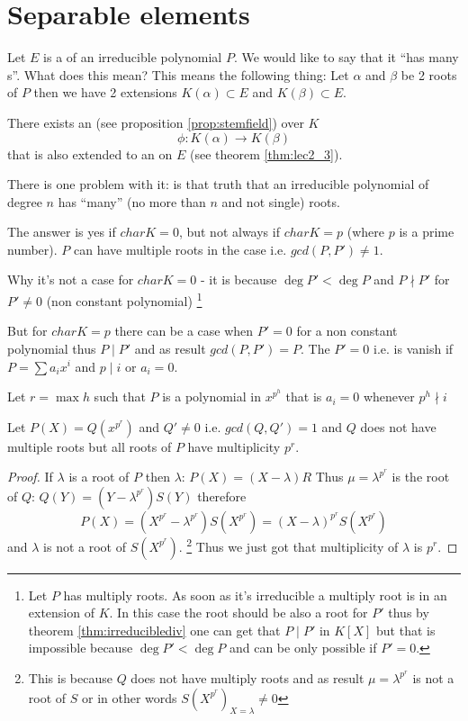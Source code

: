 \section{Separable elements}

Let $E$ is a  of an irreducible polynomial
$P$. We would like to say that it ``has many
s''. What does this mean? This means the
following thing:
Let $\alpha$ and $\beta$ be 2 roots of $P$ then we have 2 extensions
$K\left(\alpha\right) \subset E$ and 
$K\left(\beta\right) \subset E$.

There exists an  (see proposition
\ref{prop:stemfield}) over $K$
\[
\phi: K\left(\alpha\right) \to K\left(\beta\right)
\]
that is also extended to an  on $E$
(see theorem \ref{thm:lec2_3}).

There is one problem with it: is that truth that an irreducible
polynomial of degree $n$ has ``many'' (no more than $n$ and not
single) roots.

The answer is yes if $char K = 0$, but not always if $char K = p$
(where $p$ is a prime number). $P$ can have multiple roots in the case
i.e. $gcd(P, P') \ne 1$.

Why it's not a case for $char K = 0$ - it is because
$\deg P' < \deg P$ and $P \nmid P'$ for $P' \ne 0$ (non constant
polynomial)
\footnote{
  Let $P$ has multiply roots. As soon as it's irreducible a multiply
  root is in an extension of $K$. In this case the root should be also
  a root for $P'$ thus by theorem \ref{thm:irreduciblediv} one can get
  that $P \mid P'$ in $K\left[X\right]$ but that is impossible because
  $\deg P' < \deg P$ and can be only possible if $P' = 0$.
}

But for $char K = p$ there can be a case when $P' = 0$ for a non
constant polynomial thus $P \mid P'$ and as result $gcd(P, P') = P$.
The $P' = 0$ i.e. is vanish if
$P = \sum a_i x^i$ and $p \mid i$ or $a_i = 0$.

Let $r = \max h$ such that $P$ is a polynomial in $x^{p^h}$ that is
$a_i = 0$ whenever $p^h \nmid i$

\begin{proposition}
  Let $P\left(X\right) = Q\left(x^{p^r}\right)$ and $Q' \ne 0$ i.e.
  $gcd(Q, Q') = 1$ and $Q$ does not have multiple roots but
  all roots of $P$ have multiplicity $p^r$.
  \begin{proof}
    If $\lambda$ is a root of $P$ then $\lambda$:
    $P(X) = (X - \lambda)R$
    Thus $\mu = \lambda^{p^r}$ is the root of $Q$:
    $Q(Y) = (Y - \lambda^{p^r}) S(Y)$ therefore
    \[
    P(X) =
    \left(X^{p^r} - \lambda^{p^r}\right)S\left(X^{p^r}\right) =
    \left(X - \lambda\right)^{p^r}S\left(X^{p^r}\right)
    \]
    and $\lambda$ is not a root of $S\left(X^{p^r}\right)$.
    \footnote{
      This is because $Q$ does not have multiply roots and as result
      $\mu = \lambda^{p^r}$ is not a root of $S$ or in other words
      $S\left(X^{p^r}\right)_{X=\lambda} \ne 0$
      }
    Thus we just got that multiplicity of $\lambda$ is $p^r$.
  \end{proof}
  \label{prop:lect3_1}
\end{proposition}

